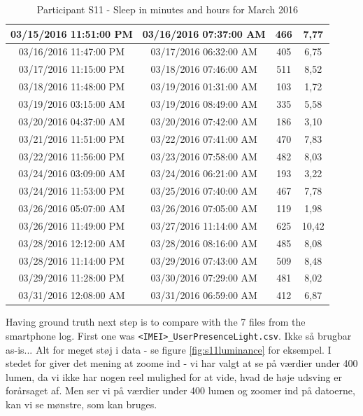 \documentclass[12pt]{article} %
\begin{document}
\begin{table}[H]
\begin{footnotesize}
\begin{tabular}{| c | c | c | c |}
\hline
03/15/2016 11:51:00 PM & 03/16/2016 07:37:00 AM	& 466 & 7,77\\
\hline
03/16/2016 11:47:00 PM & 03/17/2016 06:32:00 AM	& 405 & 6,75\\
\hline
03/17/2016 11:15:00 PM & 03/18/2016 07:46:00 AM	& 511 & 8,52\\
\hline
03/18/2016 11:48:00 PM & 03/19/2016 01:31:00 AM	& 103 & 1,72\\
\hline
\colorbox{blue!20}{03/19/2016 03:15:00 AM} & \colorbox{blue!20}{03/19/2016 08:49:00 AM} & \colorbox{blue!20}{335} & \colorbox{blue!20}{5,58}\\
\hline
\colorbox{blue!30}{03/20/2016 04:37:00 AM} & \colorbox{blue!30}{03/20/2016 07:42:00 AM} & \colorbox{blue!30}{186} & \colorbox{blue!30}{3,10}\\
\hline
03/21/2016 11:51:00 PM & 03/22/2016 07:41:00 AM	& 470 & 7,83\\
\hline
03/22/2016 11:56:00 PM & 03/23/2016 07:58:00 AM	& 482 & 8,03\\
\hline
03/24/2016 03:09:00 AM & 03/24/2016 06:21:00 AM	& 193 & 3,22\\
\hline
03/24/2016 11:53:00 PM & 03/25/2016 07:40:00 AM	& 467 & 7,78\\
\hline
\colorbox{blue!20}{03/26/2016 05:07:00 AM} & \colorbox{blue!20}{03/26/2016 07:05:00 AM} & \colorbox{blue!20}{119} & \colorbox{blue!20}{1,98}\\
\hline
\colorbox{blue!20}{03/26/2016 11:49:00 PM} & \colorbox{blue!20}{03/27/2016 11:14:00 AM} & \colorbox{blue!20}{625} & \colorbox{blue!20}{10,42}\\
\hline
03/28/2016 12:12:00 AM & 03/28/2016 08:16:00 AM	& 485 & 8,08\\
\hline
03/28/2016 11:14:00 PM & 03/29/2016 07:43:00 AM	& 509 & 8,48\\
\hline
03/29/2016 11:28:00 PM & 03/30/2016 07:29:00 AM	& 481 & 8,02\\
\hline
03/31/2016 12:08:00 AM & 03/31/2016 06:59:00 AM	& 412 & 6,87\\
	
	\hline
	\end{tabular}
	\caption{Participant S11 - Sleep in minutes and hours for March 2016}
	\label{tab:S11MarPhone}
\end{footnotesize}
\end{table}

Having ground truth next step is to compare with the 7 files from the smartphone log. First one was \texttt{<IMEI>\_UserPresenceLight.csv}. Ikke så brugbar as-is... Alt for meget støj i data - se figure \ref{fig:s11luminance} for eksempel. I stedet for giver det mening at zoome ind - vi har valgt at se på værdier under 400 lumen, da vi ikke har nogen reel mulighed for at vide, hvad de høje udsving er forårsaget af. Men ser vi på værdier under 400 lumen og zoomer ind på datoerne, kan vi se mønstre, som kan bruges.  
\end{document}
